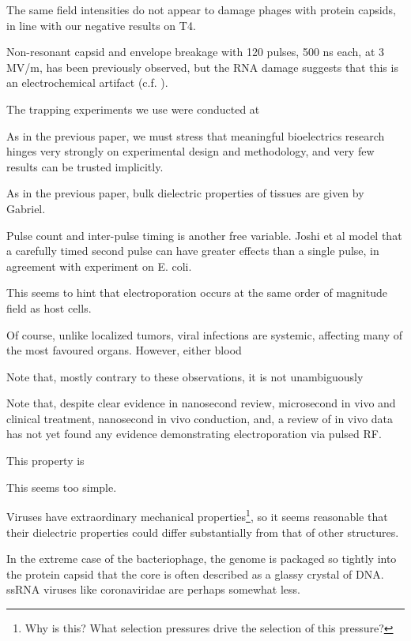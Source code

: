 \documentclass[fleqn,10pt]{paper}
\begin{document}
The same field intensities do not appear to damage phages with protein capsids\cite{Manipulation2013}, in line with our negative results on T4.

Non-resonant capsid and envelope breakage with 120 pulses, 500 ns each, at 3 MV/m, has been previously observed\cite{Inactivation1990}, but the RNA damage suggests that this is an electrochemical artifact \cite{Formation1996} (c.f. \cite{Microwave1987}). 

The trapping experiments we use were conducted at 

As in the previous paper, we must stress that meaningful bioelectrics research hinges very strongly on experimental design and methodology, and very few results can be trusted implicitly.


As in the previous paper, bulk dielectric properties of tissues are given by Gabriel. 



Pulse count and inter-pulse timing is another free variable. Joshi et al \cite{Selfconsistent2001} model that a carefully timed second pulse can have greater effects than a single pulse, in agreement with experiment on E. coli.

This seems to hint that electroporation occurs at the same order of magnitude field as host cells.

Of course, unlike localized tumors, viral infections are systemic, affecting many of the most favoured organs. However, either blood 

Note that, mostly contrary to these observations, it is not unambiguously 

Note that, despite clear evidence in nanosecond review, microsecond in vivo and clinical treatment, nanosecond in vivo conduction, and, a review of in vivo data has not yet found any evidence demonstrating electroporation via pulsed RF. 

This property is 
\cite{Nanosecond2006b} 



This seems too simple.

Viruses have extraordinary mechanical properties\footnote{Why is this? What selection pressures drive the selection of this pressure?}, so it seems reasonable that their dielectric properties could differ substantially from that of other structures. 

In the extreme case of the bacteriophage, the genome is packaged so tightly into the protein capsid that the core is often described as a glassy crystal of DNA\cite{Conformation2007}. ssRNA viruses like coronaviridae are perhaps somewhat less. 
\end{document}
